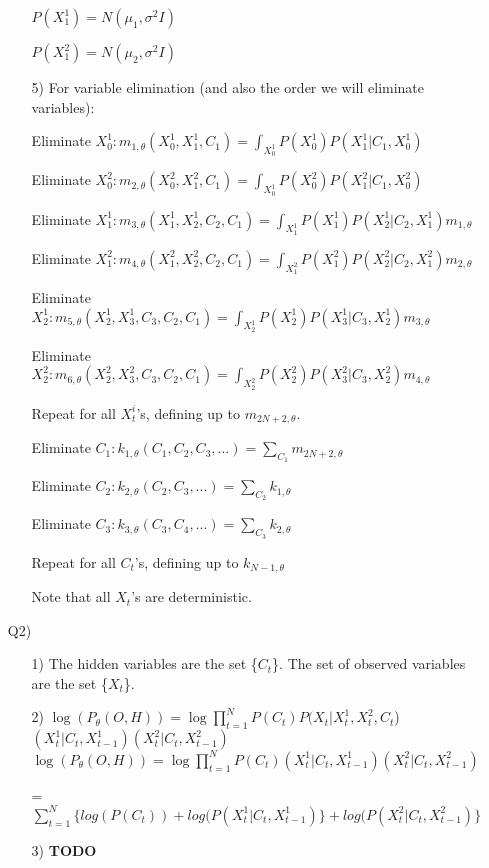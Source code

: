 \documentclass[12pt]{article}
\begin{document}
\begin{enumerate}
\begin{enumerate}
	$P(X^1_1) = N(\mu_1, \sigma^2 I)$
	
	$P(X^2_1) = N(\mu_2, \sigma^2 I)$
	
	\item[5)] For variable elimination (and also the order we will eliminate variables):

	Eliminate $X_0^1: m_{1, \theta}(X_0^1, X_1^1, C_1) =
		\int_{X_0^1}P(X_0^1)P(X_1^1 | C_1, X_0^1)$
	
	Eliminate $X_0^2: m_{2, \theta}(X_0^2, X_1^2, C_1) = 
		\int_{X_0^1}P(X_0^2)P(X_1^2 | C_1, X_0^2)$
	
	Eliminate  $X_1^1:  m_{3, \theta}(X_1^1, X_2^1, C_2, C_1) =
		\int_{X_1^1} P(X_1^1) P(X_2^1 | C_2, X_1^1) m_{1, \theta}$
		
	Eliminate  $X_1^2:  m_{4, \theta}(X_1^2, X_2^2, C_2, C_1) =
		\int_{X_1^2} P(X_1^2) P(X_2^2 | C_2, X_1^2) m_{2, \theta}$
		
	Eliminate  $X_2^1:  m_{5, \theta}(X_2^1, X_3^1, C_3, C_2, C_1) =
		\int_{X_2^1} P(X_2^1) P(X_3^1 | C_3, X_2^1) m_{3, \theta}$
		
	Eliminate  $X_2^2:  m_{6, \theta}(X_2^2, X_3^2, C_3, C_2, C_1) =
		\int_{X_2^2} P(X_2^2) P(X_3^2 | C_3, X_2^2) m_{4, \theta}$		
		
	Repeat for all $X^i_t$'s, defining up to $m_{2N+2, \theta}$.		
		
	Eliminate $C_1: k_{1, \theta}(C_1, C_2, C_3, ...) = 
		\sum_{C_1} m_{2N+2, \theta}$
		
	Eliminate $C_2: k_{2, \theta}(C_2, C_3, ...) = 
		\sum_{C_2} k_{1, \theta}$
		
	Eliminate $C_3: k_{3, \theta}(C_3, C_4, ...) = 
		\sum_{C_3} k_{2, \theta}$
		
	Repeat for all $C_t$'s, defining up to $k_{N-1, \theta}$
		
	Note that all $X_t$'s are deterministic.
	
	\end{enumerate}

\item[Q2)]

	\begin{enumerate}
	\item[1)] The hidden variables are the set \{$C_t$\}. The set of observed variables are the set \{$X_t$\}.
	
	\item[2)] $\log(P_\theta(O, H)) = \log \prod_{t=1}^N P(C_t) P(X_t | X_t^1, X_t^2, C_t$)$(X^1_t | C_t, X^1_{t-1})(X^2_t | C_t, X^2_{t-1})$
	$\log(P_\theta(O, H)) = \log \prod_{t=1}^N P(C_t)(X^1_t | C_t, X^1_{t-1})(X^2_t | C_t, X^2_{t-1})$
	
	= $\sum_{t=1}^N \{ log(P(C_t)) + log(P(X^1_t | C_t, X^1_{t-1})\} + log(P(X^2_t | C_t, X^2_{t-1})\}$
	
	\item[3)] \textbf{TODO}
	\end{enumerate}

\end{enumerate}
\end{document}
